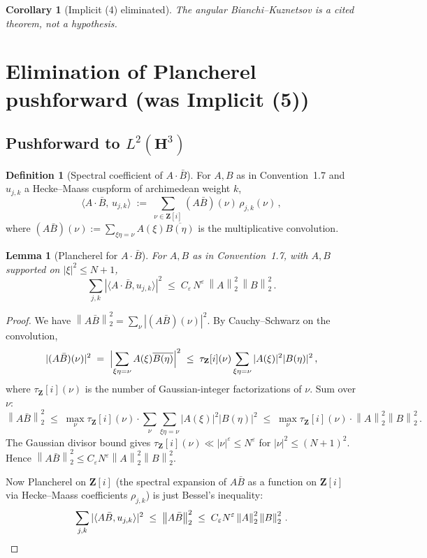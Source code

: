 \documentclass[11pt]{article}
\newtheorem{lemma}[theorem]{Lemma}
\newtheorem{corollary}[theorem]{Corollary}
\theoremstyle{definition}
\newtheorem{definition}[theorem]{Definition}
\newcommand{\Z}{\mathbf{Z}}
\newcommand{\HH}{\mathbf{H}}
\newcommand{\Zi}{\Z[i]}
\newcommand{\norm}[1]{\left\lVert #1\right\rVert}
\begin{document}
\begin{corollary}[Implicit (4) eliminated]\label{cor:elim-4}
The angular Bianchi--Kuznetsov is a cited theorem, not a hypothesis.
\end{corollary}

\section{Elimination of Plancherel pushforward (was Implicit (5))}\label{sec:elim-5}

\subsection{Pushforward to $L^2(\HH^3)$}\label{ssec:pushforward}

\begin{definition}[Spectral coefficient of $A\cdot\bar B$]\label{def:spectral-coeff}
For $A,B$ as in Convention~1.7 and $u_{j,k}$ a Hecke--Maass cuspform of archimedean weight $k$,
\[
   \langle A\cdot\bar B,\,u_{j,k}\rangle\;:=\;\sum_{\nu\in\Zi}(A\bar B)(\nu)\,\rho_{j,k}(\nu)\,,
\]
where $(A\bar B)(\nu):=\sum_{\xi\eta=\nu}A(\xi)\overline{B(\eta)}$ is the multiplicative convolution.
\end{definition}

\begin{lemma}[Plancherel for $A\cdot\bar B$]\label{lem:plancherel-AB}
For $A,B$ as in Convention~1.7, with $A,B$ supported on $|\xi|^2\le N+1$,
\[
   \sum_{j,k}|\langle A\cdot\bar B,u_{j,k}\rangle|^2\;\le\;C_\varepsilon\,N^\varepsilon\,\norm{A}_2^2\,\norm{B}_2^2\,.
\]
\end{lemma}

\begin{proof}
We have $\norm{A\bar B}_2^2=\sum_\nu|(A\bar B)(\nu)|^2$. By Cauchy--Schwarz on the convolution,
\[
   |(A\bar B)(\nu)|^2\;=\;\Bigl|\sum_{\xi\eta=\nu}A(\xi)\overline{B(\eta)}\Bigr|^2\;\le\;\tau_\Zi(\nu)\sum_{\xi\eta=\nu}|A(\xi)|^2|B(\eta)|^2\,,
\]
where $\tau_\Zi(\nu)$ is the number of Gaussian-integer factorizations of $\nu$. Sum over $\nu$:
\[
   \norm{A\bar B}_2^2\;\le\;\max_\nu\tau_\Zi(\nu)\cdot\sum_\nu\sum_{\xi\eta=\nu}|A(\xi)|^2|B(\eta)|^2\;\le\;\max_\nu\tau_\Zi(\nu)\cdot\norm A_2^2\norm B_2^2\,.
\]
The Gaussian divisor bound gives $\tau_\Zi(\nu)\ll|\nu|^\varepsilon\le N^\varepsilon$ for $|\nu|^2\le(N+1)^2$. Hence $\norm{A\bar B}_2^2\le C_\varepsilon N^\varepsilon\norm A_2^2\norm B_2^2$.

Now Plancherel on $\Zi$ (the spectral expansion of $A\bar B$ as a function on $\Zi$ via Hecke--Maass coefficients $\rho_{j,k}$) is just Bessel's inequality:
\[
   \sum_{j,k}|\langle A\bar B,u_{j,k}\rangle|^2\;\le\;\norm{A\bar B}_2^2\;\le\;C_\varepsilon N^\varepsilon\norm A_2^2\norm B_2^2\,.\qedhere
\]
\end{proof}
\end{document}
